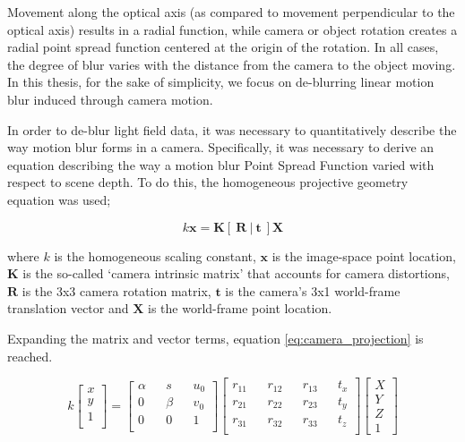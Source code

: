 Movement along the optical axis (as compared to movement perpendicular to the optical axis) results in a radial 
 function, while camera or object rotation creates a radial point spread function centered at the origin of the rotation.
In all cases, the degree of blur varies with the distance from the camera to the object moving.
In this thesis, for the sake of simplicity, we focus on de-blurring linear motion blur induced through camera motion.

In order to de-blur light field data, it was necessary to quantitatively describe the way motion blur forms in a camera.
Specifically, it was necessary to derive an equation describing the way a motion blur Point Spread Function varied with respect to scene depth.
To do this, the homogeneous projective geometry equation was used;

\begin{equation}
\label{eq:camera_projection_unexpanded}
k \boldsymbol{x} = \boldsymbol{K} \left[~\boldsymbol{R}~|~\boldsymbol{t}~\right] \boldsymbol{X}
\end{equation}

where $k$ is the homogeneous scaling constant, $\boldsymbol{x}$ is the image-space point location, $\boldsymbol{K}$ is the so-called \enquote*{camera intrinsic matrix} that accounts for camera distortions, $\boldsymbol{R}$ is the 3x3 camera rotation matrix,  $\boldsymbol{t}$ is the camera's 3x1 world-frame translation vector and $\boldsymbol{X}$ is the world-frame point location.

Expanding the matrix and vector terms, equation \ref{eq:camera_projection} is reached.

\begin{equation}
\label{eq:camera_projection}
k
\begin{bmatrix}
x \\
y \\
1 \\
\end{bmatrix}
=
\begin{bmatrix}
\alpha && s && u_0 \\
0 && \beta && v_0 \\
0 && 0 && 1 \\
\end{bmatrix}
\begin{bmatrix}
r_{11} && r_{12} && r_{13} && t_x \\
r_{21} && r_{22} && r_{23} && t_y \\
r_{31} && r_{32} && r_{33} && t_z \\
\end{bmatrix}
\begin{bmatrix}
X \\
Y \\
Z \\
1
\end{bmatrix}
\end{equation}

